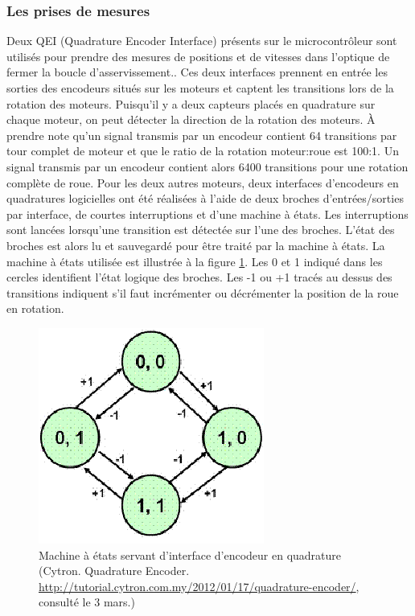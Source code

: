 \subsubsection{Les prises de mesures}
\label{asservissement_mesures}
Deux QEI (Quadrature Encoder Interface) présents sur le microcontrôleur sont utilisés pour prendre des mesures de positions et de vitesses dans l'optique de fermer la boucle d'asservissement.. Ces deux interfaces prennent en entrée les sorties des encodeurs situés sur les moteurs et captent les transitions lors de la rotation des moteurs. Puisqu'il y a deux capteurs placés en quadrature sur chaque moteur, on peut détecter la direction de la rotation des moteurs. À prendre note qu'un signal transmis par un encodeur contient 64 transitions par tour complet de moteur et que le ratio de la rotation moteur:roue est 100:1. Un signal transmis par un encodeur contient alors 6400 transitions pour une rotation complète de roue. Pour les deux autres moteurs, deux interfaces d'encodeurs en quadratures logicielles ont été réalisées à l'aide de deux broches d'entrées/sorties par interface, de courtes interruptions et d'une machine à états. Les interruptions sont lancées lorsqu'une transition est détectée sur l'une des broches. L'état des broches est alors lu et sauvegardé pour être traité par la machine à états. La machine à états utilisée est illustrée à la figure \ref{fig:cytron_machine_etats}. Les 0 et 1 indiqué dans les cercles identifient l'état logique des broches. Les -1 ou +1 tracés au dessus des transitions indiquent s'il faut incrémenter ou décrémenter la position de la roue en rotation.
\begin{figure}[htbp]
\centering
\includegraphics[scale=0.7]{fig/cytron_machine_etats.png}
\caption{Machine à états servant d'interface d'encodeur en quadrature (Cytron. Quadrature Encoder. \url{http://tutorial.cytron.com.my/2012/01/17/quadrature-encoder/}, consulté le 3 mars.)}
\label{fig:cytron_machine_etats}
\end{figure}
